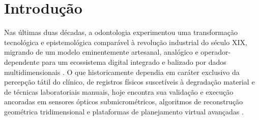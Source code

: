\section{Introdução}
\label{sec:panorama-intro}

Nas últimas duas décadas, a odontologia experimentou uma transformação tecnológica e epistemológica comparável à revolução industrial do século XIX, migrando de um modelo eminentemente artesanal, analógico e operador-dependente para um ecossistema digital integrado e balizado por dados multidimensionais \cite{mdpi2025convergence}. O que historicamente dependia em caráter exclusivo da percepção tátil do clínico, de registros físicos suscetíveis à degradação material e de técnicas laboratoriais manuais, hoje encontra sua validação e execução ancoradas em sensores ópticos submicrométricos, algoritmos de reconstrução geométrica tridimensional e plataformas de planejamento virtual avançadas \cite{roy2025applications}. 



